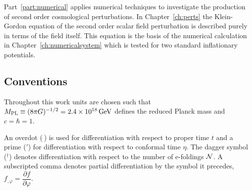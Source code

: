 Part~\ref{part:numerical} applies numerical techniques to investigate the
production of second order cosmological perturbations. In
Chapter~\ref{ch:perts} the Klein-Gordon equation of the second order
scalar field perturbation is described purely in terms of the field itself.
This equation is the basis of the numerical calculation in
Chapter~\ref{ch:numericalsystem} which is tested for two standard inflationary
potentials. 



\subsection*{Conventions}
\label{sec:conventions}
Throughout this work units are chosen such that $M_{\mathrm{PL}} \equiv (8\pi G )^{-1/2}=
2.4 \times 10^{18}\, {\rm GeV}$ defines the reduced Planck mass and $c=\hbar =1$. 

An overdot ($\dot{~}$) is used for differentiation with respect to proper
time $t$ and a prime ($'$) for differentiation with respect to conformal time
$\eta$. The dagger symbol ($^\dagger$) denotes differentiation with respect to the
number of e-foldings $\mathcal{N}$.
% 
A subscripted comma denotes partial differentiation by the symbol it
precedes, \eg $f_{,\varphi} = \dfrac{\partial f}{\partial \varphi}$.


